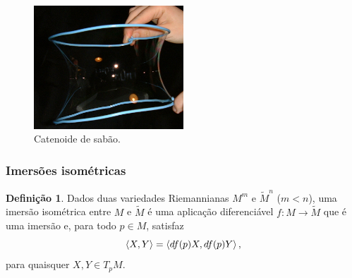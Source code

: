 \documentclass[10pt,a4paper]{beamer}
\theoremstyle{definition}
\newtheorem{definicao}{Definição}
\begin{document}
\begin{frame}	
	
	\begin{figure}
		\centering
		\includegraphics[width=0.5\textwidth]{images/soap-catenoid}
		\caption{Catenoide de sabão.}
	\end{figure}
	
\end{frame}

\begin{frame}
	\frametitle{Imersões isométricas}
	
	\begin{definicao}
		Dados duas variedades Riemannianas $M^m$ e $\tilde{M}^n$ ($m < n$), uma \alert{imersão isométrica} entre $M$ e
		$\tilde{M}$ é uma aplicação diferenciável $f : M \rightarrow \tilde{M}$ que é uma imersão e, para todo $p \in M$, satisfaz
		\begin{equation*}
			\left\langle X,Y \right\rangle = \left\langle df(p) X,df(p) Y \right\rangle,
		\end{equation*}
		para quaisquer $X,Y \in T_p M$.
	\end{definicao}

\end{frame}
\end{document}

